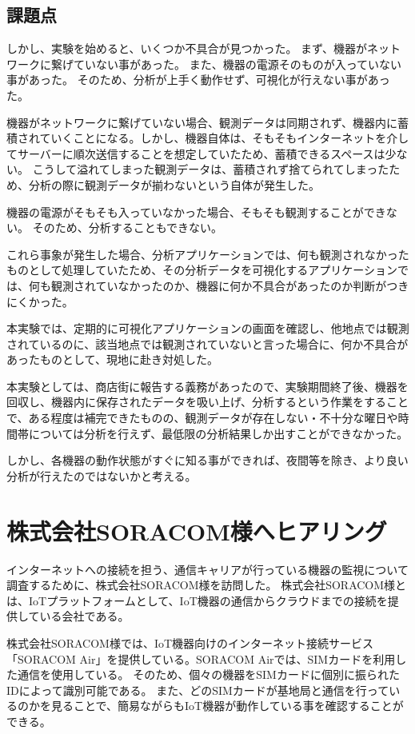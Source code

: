 \subsection{課題点}

しかし、実験を始めると、いくつか不具合が見つかった。
まず、機器がネットワークに繋げていない事があった。
また、機器の電源そのものが入っていない事があった。
そのため、分析が上手く動作せず、可視化が行えない事があった。

機器がネットワークに繋げていない場合、観測データは同期されず、機器内に蓄積されていくことになる。しかし、機器自体は、そもそもインターネットを介してサーバーに順次送信することを想定していたため、蓄積できるスペースは少ない。
こうして溢れてしまった観測データは、蓄積されず捨てられてしまったため、分析の際に観測データが揃わないという自体が発生した。

機器の電源がそもそも入っていなかった場合、そもそも観測することができない。
そのため、分析することもできない。

これら事象が発生した場合、分析アプリケーションでは、何も観測されなかったものとして処理していたため、その分析データを可視化するアプリケーションでは、何も観測されていなかったのか、機器に何か不具合があったのか判断がつきにくかった。

本実験では、定期的に可視化アプリケーションの画面を確認し、他地点では観測されているのに、該当地点では観測されていないと言った場合に、何か不具合があったものとして、現地に赴き対処した。

本実験としては、商店街に報告する義務があったので、実験期間終了後、機器を回収し、機器内に保存されたデータを吸い上げ、分析するという作業をすることで、ある程度は補完できたものの、観測データが存在しない・不十分な曜日や時間帯については分析を行えず、最低限の分析結果しか出すことができなかった。

しかし、各機器の動作状態がすぐに知る事ができれば、夜間等を除き、より良い分析が行えたのではないかと考える。




\section{株式会社SORACOM様へヒアリング}
インターネットへの接続を担う、通信キャリアが行っている機器の監視について調査するために、株式会社SORACOM様を訪問した。
株式会社SORACOM様とは、IoTプラットフォームとして、IoT機器の通信からクラウドまでの接続を提供している会社である。

株式会社SORACOM様では、IoT機器向けのインターネット接続サービス「SORACOM Air」を提供している。SORACOM Airでは、SIMカードを利用した通信を使用している。
そのため、個々の機器をSIMカードに個別に振られたIDによって識別可能である。
また、どのSIMカードが基地局と通信を行っているのかを見ることで、簡易ながらもIoT機器が動作している事を確認することができる。




